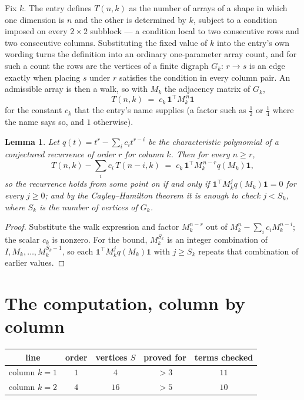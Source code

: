 \documentclass[11pt,a4paper]{article}
\theoremstyle{plain}
\newtheorem{lemma}[theorem]{Lemma}
\theoremstyle{definition}
\begin{document}
Fix $k$. The entry defines $T(n,k)$ as the number of arrays of a shape in which one dimension
is $n$ and the other is determined by $k$, subject to a condition imposed on every
$2\times2$ subblock --- a condition local to two consecutive rows and two consecutive columns.
Substituting the fixed value of $k$ into the entry's own wording turns the definition into an
ordinary one-parameter array count, and for such a count the rows are the vertices of a finite
digraph $G_k$: $r\to s$ is an edge exactly when placing $s$ under $r$ satisfies the condition
in every column pair. An admissible array is then a walk, so with $M_k$ the adjacency matrix
of $G_k$,
\[
T(n,k)\;=\;c_k\,\mathbf{1}^{\!\top}M_k^{\,n}\mathbf{1}
\]
for the constant $c_k$ that the entry's name supplies (a factor such as $\tfrac12$ or
$\tfrac14$ where the name says so, and $1$ otherwise).

\begin{lemma}\label{lem:crit}
Let $q(t)=t^{r}-\sum_i c_it^{r-i}$ be the characteristic polynomial of a conjectured
recurrence of order $r$ for column $k$. Then for every $n\ge r$,
\[
T(n,k)-\sum_i c_i\,T(n-i,k)\;=\;c_k\,\mathbf{1}^{\!\top}M_k^{\,n-r}q(M_k)\mathbf{1},
\]
so the recurrence holds from some point on if and only if
$\mathbf{1}^{\!\top}M_k^{j}q(M_k)\mathbf{1}=0$ for every $j\ge0$; and by the
Cayley--Hamilton theorem it is enough to check $j<S_k$, where $S_k$ is the number of vertices
of $G_k$.
\end{lemma}

\begin{proof}
Substitute the walk expression and factor $M_k^{n-r}$ out of $M_k^{n}-\sum_ic_iM_k^{n-i}$;
the scalar $c_k$ is nonzero. For the bound, $M_k^{S_k}$ is an integer combination of
$I,M_k,\dots,M_k^{S_k-1}$, so each $\mathbf{1}^{\!\top}M_k^{j}q(M_k)\mathbf{1}$ with
$j\ge S_k$ repeats that combination of earlier values.
\end{proof}

\section{The computation, column by column}

\begin{center}
\begin{tabular}{ccccc}
line & order & vertices $S$ & proved for & terms checked \\ \hline
column $k$$=1$ & $1$ & $4$ & $>3$ & $11$ \\
column $k$$=2$ & $4$ & $16$ & $>5$ & $10$ \\
\end{tabular}
\end{center}
\end{document}
